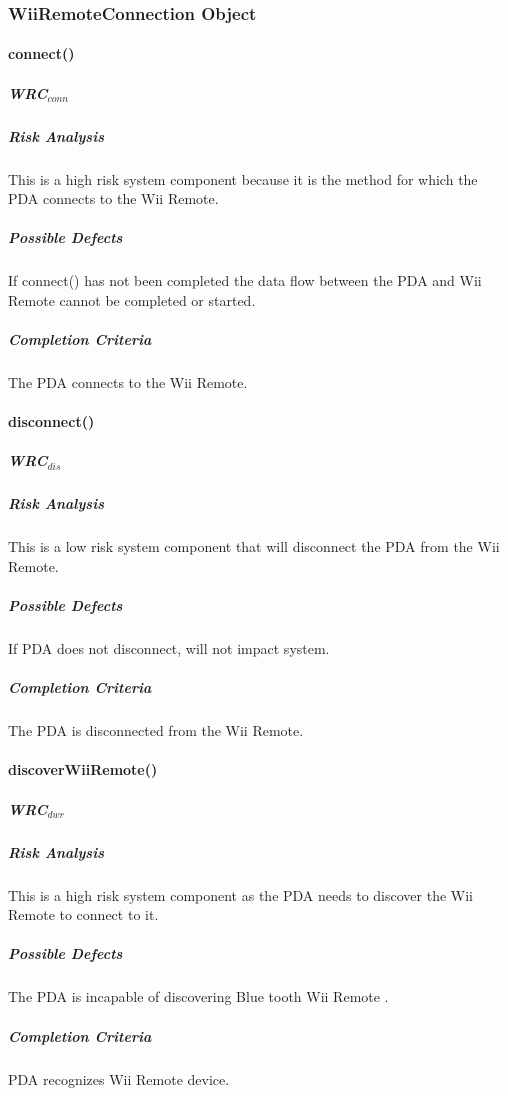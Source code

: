 \documentclass{article}
\begin{document}
\subsubsection{WiiRemoteConnection Object}

\paragraph{connect()}

\subparagraph{WRC$_{conn}$}

\subparagraph{Risk Analysis}
This is a high risk system component because it is the method for which the PDA connects to the Wii Remote.

\subparagraph{Possible Defects}
If connect() has not been completed the data flow between the PDA and Wii Remote cannot be completed or started.

\subparagraph{Completion Criteria}
The PDA connects to the Wii Remote.

\paragraph{disconnect()}

\subparagraph{WRC$_{dis}$}

\subparagraph{Risk Analysis}
This is a low risk system component that will disconnect the PDA from the Wii Remote.

\subparagraph{Possible Defects}
If PDA does not disconnect, will not impact system.

\subparagraph{Completion Criteria}
The PDA is disconnected from the Wii Remote.

\paragraph{discoverWiiRemote()}

\subparagraph{WRC$_{dwr}$}

\subparagraph{Risk Analysis}
This is a high risk system component as the PDA needs to discover the Wii Remote to connect to it.

\subparagraph{Possible Defects}
The PDA is incapable of discovering Blue tooth Wii Remote
.
\subparagraph{Completion Criteria}
PDA recognizes Wii Remote device.
\end{document}
